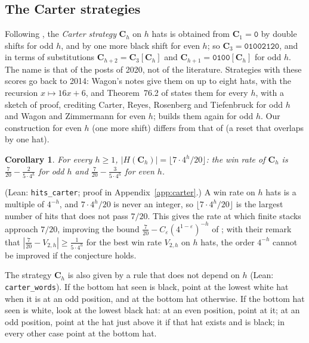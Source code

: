 \documentclass[11pt,a4paper]{article}
\newtheorem{corollary}[theorem]{Corollary}
\theoremstyle{definition}
\theoremstyle{remark}
\newcommand{\lean}[1]{\texttt{#1}}
\newcommand{\str}[1]{\mathtt{#1}}
\newcommand{\C}{\mathbf{C}}
\begin{document}
\subsection{The Carter strategies}

Following \cite{R20}, the \emph{Carter strategy} $\C_h$ on $h$ hats is
obtained from $\C_1 = \str{0}$ by double shifts for odd $h$, and by one
more black shift for even $h$; so $\C_3 = \str{01002120}$, and in terms
of substitutions $\C_{h+2} = \C_3[\C_h]$ and
$\C_{h+1} = \str{0100}[\C_h]$ for odd $h$. The name is that of the posts
of 2020, not of the literature. Strategies with these scores go back to 2014: Wagon's notes \cite{Wa14}
give them on up to eight hats, with the recursion $x \mapsto 16x+6$, and
Theorem~76.2 of \cite{VW20} states them for every $h$, with a sketch of
proof, crediting Carter, Reyes, Rosenberg and Tiefenbruck for odd $h$ and
Wagon and Zimmermann for even $h$; \cite{BCCZW} builds them again for odd
$h$. Our construction for even $h$ (one more shift) differs from that of
\cite{VW20} (a reset that overlaps by one hat).

\begin{corollary}\label{cor:carter}
For every $h \ge 1$, $|H(\C_h)| = \lfloor 7\cdot 4^h/20 \rfloor$: the
win rate of $\C_h$ is $\frac{7}{20} - \frac{2}{5\cdot 4^h}$ for odd $h$
and $\frac{7}{20} - \frac{3}{5\cdot 4^h}$ for even $h$.
\end{corollary}

(Lean: \lean{hits\_carter}; proof in Appendix~\ref{app:carter}.) A win rate on $h$ hats is a multiple of
$4^{-h}$, and $7\cdot 4^h/20$ is never an integer, so
$\lfloor 7\cdot 4^h/20\rfloor$ is the largest number of hits that does
not pass $7/20$. This gives the rate at which finite stacks approach
$7/20$, improving the bound $\frac{7}{20} - C_\varepsilon
(4^{1-\varepsilon})^{-h}$ of \cite{BCCZW}; with their remark that
$|\frac{7}{20} - V_{2,h}| \ge \frac{1}{5\cdot 4^h}$ for the best win
rate $V_{2,h}$ on $h$ hats, the order $4^{-h}$ cannot be improved if the
conjecture holds.

The strategy $\C_h$ is also given by a rule that does not depend on $h$
(Lean: \lean{carter\_words}). If the bottom hat seen is black, point at
the lowest white hat when it is at an odd position, and at the bottom hat
otherwise. If the bottom hat seen is white, look at the lowest black hat:
at an even position, point at it; at an odd position, point at the hat
just above it if that hat exists and is black; in every other case point
at the bottom hat.
\end{document}
